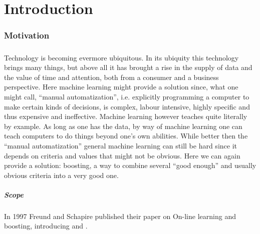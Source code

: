 
\chapter{Introduction}
\label{chap:intro}
\subsection*{Motivation}
\label{sec:motiv}

\paragraph*{}Technology is becoming evermore ubiquitous. In its ubiquity this technology brings many things, but above all it has brought a rise in the supply of data and the value of time and attention, both from a consumer and a business perspective. Here machine learning might provide a solution since, what one might call, ``manual automatization'', i.e. explicitly programming a computer to make certain kinds of decisions, is complex, labour intensive, highly specific and thus expensive and ineffective. Machine learning however teaches quite literally by example. As long as one has the data, by way of machine learning one can teach computers to do things beyond one's own abilities. While better then the ``manual automatization'' general machine learning can still be hard since it depends on criteria and values that might not be obvious. Here we can again provide a solution: boosting, a way to combine several ``good enough'' and usually obvious criteria into a very good one. 

\paragraph*{Scope} In 1997 Freund and Schapire  \cite{Freund1997} published their paper on On-line learning and boosting, introducing \hedge and \ada.
